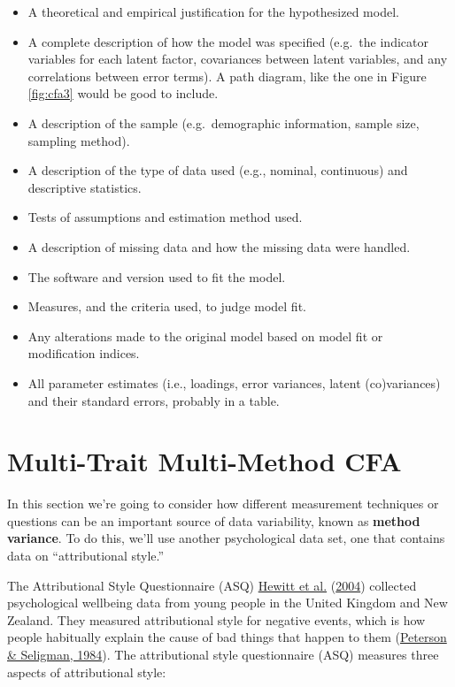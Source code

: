 \documentclass[
]{book}
\providecommand{\tightlist}{%
  \setlength{\itemsep}{0pt}\setlength{\parskip}{0pt}}
\begin{document}
\begin{itemize}
\tightlist
\item
  A theoretical and empirical justification for the hypothesized model.
\item
  A complete description of how the model was specified (e.g.~the indicator variables for each latent factor, covariances between latent variables, and any correlations between error terms). A path diagram, like the one in Figure \ref{fig:cfa3} would be good to include.
\item
  A description of the sample (e.g.~demographic information, sample size, sampling method).
\item
  A description of the type of data used (e.g., nominal, continuous) and descriptive statistics.
\item
  Tests of assumptions and estimation method used.
\item
  A description of missing data and how the missing data were handled.
\item
  The software and version used to fit the model.
\item
  Measures, and the criteria used, to judge model fit.
\item
  Any alterations made to the original model based on model fit or modification indices.
\item
  All parameter estimates (i.e., loadings, error variances, latent (co)variances) and their standard errors, probably in a table.
\end{itemize}

\hypertarget{MTMM}{%
\section{Multi-Trait Multi-Method CFA}\label{MTMM}}

In this section we're going to consider how different measurement techniques or questions can be an important source of data variability, known as {\textbf{method variance}}. To do this, we'll use another psychological data set, one that contains data on ``attributional style.''

The Attributional Style Questionnaire (ASQ) \protect\hyperlink{ref-Hewitt2004}{Hewitt et al.} (\protect\hyperlink{ref-Hewitt2004}{2004}) collected psychological wellbeing data from young people in the United Kingdom and New Zealand. They measured attributional style for negative events, which is how people habitually explain the cause of bad things that happen to them (\protect\hyperlink{ref-Peterson1984}{Peterson \& Seligman, 1984}). The attributional style questionnaire (ASQ) measures three aspects of attributional style:
\end{document}
